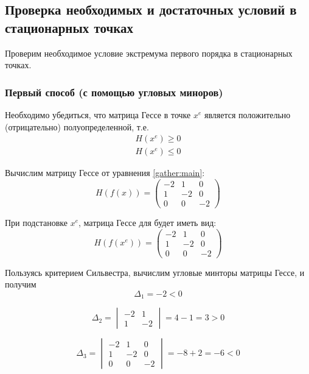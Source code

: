 \subsection{Проверка необходимых и достаточных условий в стационарных точках}
    Проверим необходимое условие экстремума первого порядка в стационарных точках. 
    \subsubsection{Первый способ (с помощью угловых миноров)}
        Необходимо убедиться, что матрица Гессе в точке $x^e$  является положительно (отрицательно) полуопределенной, т.е.
        \begin{gather}
        H(x^e) \geq 0 \nonumber \\
        H(x^e) \leq 0 \nonumber
        \end{gather}
        
        Вычислим матрицу Гессе от уравнения \ref{gather:main}:
        \[
        H(f(x)) = 
        \begin{pmatrix}
            -2 &  1 & 0 \\
             1 & -2 & 0 \\
             0 &  0 & -2
        \end{pmatrix}\]
        
        При подстановке $x^e$, матрица Гессе для будет иметь вид:
        \[
        H(f(x^e)) =
        \begin{pmatrix}
            -2 &  1 & 0 \\
             1 & -2 & 0 \\
             0 &  0 & -2
        \end{pmatrix}\]
        
        Пользуясь критерием Сильвестра, вычислим угловые минторы матрицы Гессе, и получим
        \[
        \Delta_1 = -2 < 0
        \]
        
        \[
        \Delta_2 = 
        \begin{vmatrix}
            -2 &  1 \\
             1 & -2 
        \end{vmatrix} = 4 - 1 = 3 > 0
        \]
        
        \[
        \Delta_3 = 
        \begin{vmatrix}
            -2 &  1 & 0 \\
             1 & -2 & 0 \\
             0 &  0 & -2
        \end{vmatrix} = -8 + 2 = -6 < 0
        \]
        
